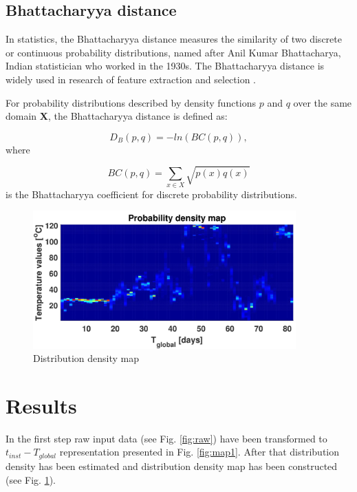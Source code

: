 \documentclass{svproc}
\begin{document}
\subsection{Bhattacharyya distance}

In statistics, the Bhattacharyya distance measures the similarity of two discrete or continuous probability distributions, named after Anil Kumar Bhattacharya, Indian statistician who worked in the 1930s. The Bhattacharyya distance is widely used in research of feature extraction and selection \cite{choi2003feature}.

For probability distributions described by density functions $p$ and $q$ over the same domain \textbf{X}, the Bhattacharyya distance is defined as:

\begin{equation*}
    D_B(p,q)=-ln(BC(p,q)),
\end{equation*}
where

\begin{equation*}
    BC(p,q)=\sum_{x \in X} \sqrt{p(x)q(x)}
\end{equation*}
is the Bhattacharyya coefficient for discrete probability distributions.

\begin{figure}[ht!]
\centering
\includegraphics[width=0.9\textwidth]{figs/Fig05.jpg}
\caption{Distribution density map}
\label{fig:map2}
\end{figure}

\section{Results}\label{res}

In the first step raw input data (see Fig. \ref{fig:raw}) have been transformed to $t_{inst}-T_{global}$ representation presented in Fig. \ref{fig:map1}. After that distribution density has been estimated and distribution density map has been constructed (see Fig. \ref{fig:map2}).
\end{document}
